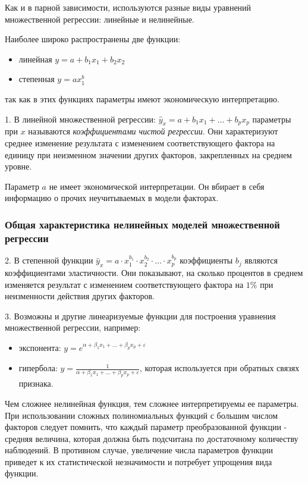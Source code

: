 \documentclass[aps,%
12pt,%
final,%
oneside,
onecolumn,%
musixtex, %
superscriptaddress,%
centertags]{article} %
\theoremstyle{plain}
\theoremstyle{definition}
\theoremstyle{remark}
\begin{document}
Как и в парной зависимости, используются разные виды уравнений множественной регрессии: линейные и нелинейные.

Наиболее широко распространены две функции:
\begin{itemize}
	\item линейная $y = a + b_1x_1 + b_2x_2 $
	\item степенная $y = ax_1^b $
\end{itemize}
так как в этих функциях параметры имеют экономическую интерпретацию.

1. В линейной множественной регрессии: $\hat{y}_x = a + b_1x_1 + \ldots + b_px_p$ параметры при $x$ называются \textit{коэффициентами чистой регрессии}. Они характеризуют среднее изменение результата с изменением соответствующего фактора на единицу при неизменном значении других факторов, закрепленных на среднем уровне.

Параметр $a$ не имеет экономической интерпретации. Он вбирает в себя информацию о прочих неучитываемых в модели факторах.

\subsubsection{Общая характеристика нелинейных моделей множественной регрессии}

2. В степенной функции $\hat{y}_x = a \cdot x_1^{b_1} \cdot x_2^{b_2} \cdot \ldots \cdot x_p ^{b_p}$ коэффициенты $b_j$ являются коэффициентами эластичности. Они показывают, на сколько процентов в среднем изменяется результат с изменением соответствующего фактора на $1\%$ при неизменности действия других факторов. 

3. Возможны и другие линеаризуемые функции для построения уравнения множественной регрессии, например:
\begin{itemize}
	\item экспонента: $y = e^{\alpha + \beta_1x_1 + \ldots + \beta_px_p + \varepsilon}$
	\item гипербола: $y = \frac{1}{\alpha + \beta_1x_1 + \ldots + \beta_px_p + \varepsilon}$, которая используется при обратных связях признака.
\end{itemize}

Чем сложнее нелинейная функция, тем сложнее интерпретируемы ее параметры. При использовании сложных полиномиальных функций с большим числом факторов следует помнить, что каждый параметр преобразованной функции - средняя величина, которая должна быть подсчитана по достаточному количеству наблюдений. В противном случае, увеличение числа параметров функции приведет к их статистической незначимости и потребует упрощения вида функции.
\end{document}
